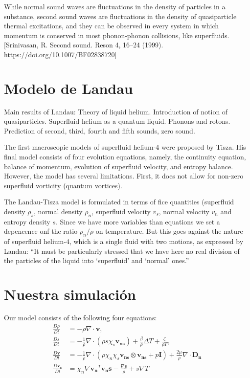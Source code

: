 \documentclass{article}
\begin{document}
While normal sound waves are fluctuations in the density of particles in a substance, second sound waves are fluctuations in the density of quasiparticle thermal excitations, and they can be observed in every system in which momentum is conserved in most phonon-phonon collisions, like superfluids. [Srinivasan, R. Second sound. Reson 4, 16–24 (1999). https://doi.org/10.1007/BF02838720]



\section{Modelo de Landau}
\cite{Kincl}
Main results of Landau:
Theory of liquid helium. Introduction of notion of quasiparticles. Superfluid
helium as a quantum liquid. Phonons and rotons. Prediction of second, third,
fourth and fifth sounds, zero sound.

\cite{PhysRev.60.356}

The first macroscopic models of superfluid helium-4 were
proposed by Tisza. His final model consists of four evolution equations, namely, the continuity equation, balance of momentum, evolution of superfluid velocity, and entropy balance. However, the model has several limitations. First, it does not allow for non-zero superfluid vorticity (quantum vortices). 

The Landau-Tisza model is formulated in terms of fice quantities (superfluid density $\rho_s$, normal density $\rho_n$, superfluid velocity $v_s$, normal velocity $v_n$ and entropy density $s$. Since we have more variables than equations we set a depencence onf the ratio $\rho_n/\rho$ on temperature. But this goes against the nature of superfluid helium-4, which is a single fluid with two motions, as expressed by Landau: “It must be particularly stressed that we
have here no real division of the particles of the liquid into ‘superfluid’
and ‘normal’ ones.”


\section{Nuestra simulación}
Our model consists of the following four equations:
\begin{align}
\frac{D\rho}{Dt} &= -\rho \nabla \cdot \mathbf{v}, \\
\frac{Ds}{Dt} &= -\frac{1}{\rho} \nabla \cdot (\rho s \chi_s \mathbf{v_{ns}}) + \frac{\beta}{\rho} \Delta T + \frac{\zeta}{\rho T} ,\\
\frac{D\mathbf{v}}{Dt} &= -\frac{1}{\rho} \nabla \cdot (\rho \chi_n \chi_s \mathbf{v_{ns}} \otimes \mathbf{v_{ns}} + p \mathbf{I}) + \frac{2 \mu}{\rho} \nabla \cdot \mathbf{D_n} \\
\frac{D\mathbf{v_s}}{Dt} &= \chi_n \nabla \mathbf{v_n}^T \mathbf{v_ns} - \frac{\nabla p}{\rho} + s \nabla T
\end{align}
\end{document}
